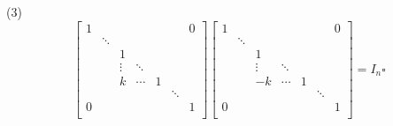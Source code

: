 \documentclass[UTF8]{ctexart}
\DeclareMathOperator{\0}{\mathbf{0}}
\DeclareMathOperator{\<}{\langle}
\renewcommand{\>}{\rangle}
\begin{document}
\begin{prf}
			(3)
			\[
			\begin{bmatrix}
				1 & & & & & & 0\\
				&\ddots & & & & & \\
				& & 1 & & & & \\
				& &\vdots &\ddots & & & \\
				& & k & \cdots & 1 & & \\
				& & & & &\ddots & \\
				0 & & & & & & 1\\
			\end{bmatrix}
			\begin{bmatrix}
				1 & & & & & & 0\\
				&\ddots & & & & & \\
				& & 1 & & & & \\
				& &\vdots &\ddots & & & \\
				& & -k & \cdots & 1 & & \\
				& & & & &\ddots & \\
				0 & & & & & & 1\\
			\end{bmatrix}=I_n\square
			\]
		\end{prf}
		
\end{document}
